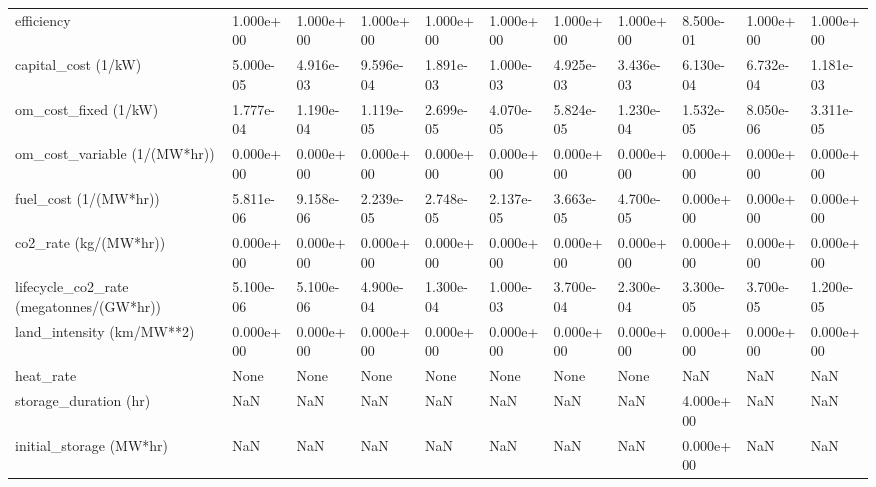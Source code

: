 \begin{tabular}{lllllllllll}
efficiency                              &   1.000e+00 &   1.000e+00 &       1.000e+00 &      1.000e+00 &   1.000e+00 &   1.000e+00 &   1.000e+00 &  8.500e-01 &   1.000e+00 &   1.000e+00 \\
capital\_cost (1/kW)                     &   5.000e-05 &   4.916e-03 &       9.596e-04 &      1.891e-03 &   1.000e-03 &   4.925e-03 &   3.436e-03 &  6.130e-04 &   6.732e-04 &   1.181e-03 \\
om\_cost\_fixed (1/kW)                    &   1.777e-04 &   1.190e-04 &       1.119e-05 &      2.699e-05 &   4.070e-05 &   5.824e-05 &   1.230e-04 &  1.532e-05 &   8.050e-06 &   3.311e-05 \\
om\_cost\_variable (1/(MW*hr))            &   0.000e+00 &   0.000e+00 &       0.000e+00 &      0.000e+00 &   0.000e+00 &   0.000e+00 &   0.000e+00 &  0.000e+00 &   0.000e+00 &   0.000e+00 \\
fuel\_cost (1/(MW*hr))                   &   5.811e-06 &   9.158e-06 &       2.239e-05 &      2.748e-05 &   2.137e-05 &   3.663e-05 &   4.700e-05 &  0.000e+00 &   0.000e+00 &   0.000e+00 \\
co2\_rate (kg/(MW*hr))                   &   0.000e+00 &   0.000e+00 &       0.000e+00 &      0.000e+00 &   0.000e+00 &   0.000e+00 &   0.000e+00 &  0.000e+00 &   0.000e+00 &   0.000e+00 \\
lifecycle\_co2\_rate (megatonnes/(GW*hr)) &   5.100e-06 &   5.100e-06 &       4.900e-04 &      1.300e-04 &   1.000e-03 &   3.700e-04 &   2.300e-04 &  3.300e-05 &   3.700e-05 &   1.200e-05 \\
land\_intensity (km/MW**2)               &   0.000e+00 &   0.000e+00 &       0.000e+00 &      0.000e+00 &   0.000e+00 &   0.000e+00 &   0.000e+00 &  0.000e+00 &   0.000e+00 &   0.000e+00 \\
heat\_rate                               &        None &        None &            None &           None &        None &        None &        None &        NaN &         NaN &         NaN \\
storage\_duration (hr)                   &         NaN &         NaN &             NaN &            NaN &         NaN &         NaN &         NaN &  4.000e+00 &         NaN &         NaN \\
initial\_storage (MW*hr)                 &         NaN &         NaN &             NaN &            NaN &         NaN &         NaN &         NaN &  0.000e+00 &         NaN &         NaN \\
\bottomrule
\end{tabular}
